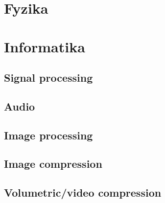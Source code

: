 \section{Fyzika}
    
    
    
\section{Informatika}
    \subsection{Signal processing}
    \subsection{Audio}
    \subsection{Image processing}
    \subsection{Image compression}
    \subsection{Volumetric/video compression}
     
